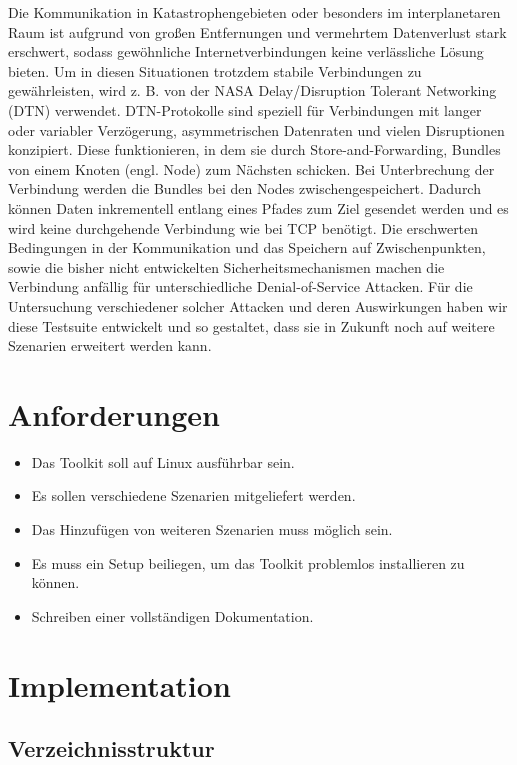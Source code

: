 \documentclass{article}
\begin{document}
Die Kommunikation in Katastrophengebieten oder besonders im interplanetaren Raum ist aufgrund von großen Entfernungen und vermehrtem Datenverlust stark erschwert, sodass gewöhnliche Internetverbindungen keine verlässliche Lösung bieten. Um in diesen Situationen trotzdem stabile Verbindungen zu gewährleisten, wird z. B. von der NASA Delay/Disruption Tolerant Networking (DTN) verwendet.
DTN-Protokolle sind speziell für Verbindungen mit langer oder variabler Verzögerung, asymmetrischen Datenraten und vielen Disruptionen konzipiert. Diese funktionieren, in dem sie durch Store-and-Forwarding, Bundles von einem Knoten (engl. Node) zum Nächsten schicken. Bei Unterbrechung der Verbindung werden die Bundles bei den Nodes zwischengespeichert. Dadurch können Daten inkrementell entlang eines Pfades zum Ziel gesendet werden und es wird keine durchgehende Verbindung wie bei TCP benötigt. 
Die erschwerten Bedingungen in der Kommunikation und das Speichern auf Zwischenpunkten, sowie die bisher nicht entwickelten Sicherheitsmechanismen machen die Verbindung anfällig für unterschiedliche Denial-of-Service Attacken. Für die Untersuchung verschiedener solcher Attacken und deren Auswirkungen haben wir diese Testsuite entwickelt und so gestaltet, dass sie in Zukunft noch auf weitere Szenarien erweitert werden kann.  

\section{Anforderungen}
\begin{itemize}
    \item Das Toolkit soll auf Linux ausführbar sein.
    \item Es sollen verschiedene Szenarien mitgeliefert werden.
    \item Das Hinzufügen von weiteren Szenarien muss möglich sein.
    \item Es muss ein Setup beiliegen, um das Toolkit problemlos installieren zu können.
    \item Schreiben einer vollständigen Dokumentation.
\end{itemize}

\section{Implementation}
\subsection{Verzeichnisstruktur}
\end{document}
